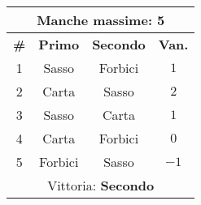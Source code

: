 \documentclass[a4paper]{article}
\begin{document}
\begin{figure}[H]
\begin{minipage}{\linewidth}
\begin{minipage}{0.45\linewidth}
\begin{tabular}{|c|c|c|c|}
          \multicolumn{4}{|c|}{\footnotesize Manche massime: \textbf{5}} \\
          \hline
          \footnotesize \textbf{\#} & \footnotesize \textbf{Primo} & \footnotesize \textbf{Secondo} & \footnotesize \textbf{Van.} \\
          \hline
          1 & Sasso & Forbici & \( 1 \)  \\
          2 & Carta & Sasso & \( 2 \)  \\
          3 & Sasso & Carta & \( 1 \)  \\
          4 & Carta & Forbici & \( 0 \)  \\
          5 & Forbici & Sasso & \( -1 \)  \\
          \hline
          \multicolumn{4}{|c|}{\footnotesize Vittoria: \textbf{Secondo}} \\
          \hline
        \end{tabular}
		\end{minipage}
	\end{minipage}

  \vspace{0.5cm}


\end{figure}
\end{document}
